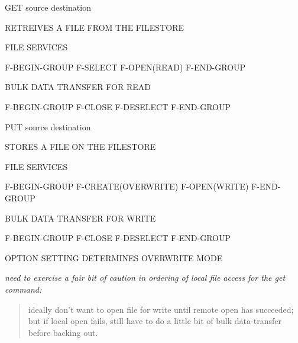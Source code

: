 \begin{bwslide}

\begin{nrtc}
\item	GET source destination
    \begin{nrtc}
    \item	RETREIVES A FILE FROM THE FILESTORE

    \item	FILE SERVICES
	\begin{nrtc}
	\item	F-BEGIN-GROUP F-SELECT F-OPEN(READ) F-END-GROUP

	\item	BULK DATA TRANSFER FOR READ

	\item	F-BEGIN-GROUP F-CLOSE F-DESELECT F-END-GROUP
	\end{nrtc}
    \end{nrtc}

\item	PUT source destination
    \begin{nrtc}
    \item	STORES A FILE ON THE FILESTORE

    \item	FILE SERVICES
	\begin{nrtc}
	\item	F-BEGIN-GROUP F-CREATE(OVERWRITE) F-OPEN(WRITE) F-END-GROUP

	\item	BULK DATA TRANSFER FOR WRITE

	\item	F-BEGIN-GROUP F-CLOSE F-DESELECT F-END-GROUP
	\end{nrtc}

    \item	OPTION SETTING DETERMINES OVERWRITE MODE
    \end{nrtc}
\end{nrtc}
\end{bwslide}


\begin{note}\em
need to exercise a fair bit of caution in ordering of local file access for
the get command: 

\begin{quote}
ideally don't want to open file for write until remote open
has succeeded; but if local open fails, still have to do a little bit of bulk
data-transfer before backing out.
\end{quote}
\end{note}



